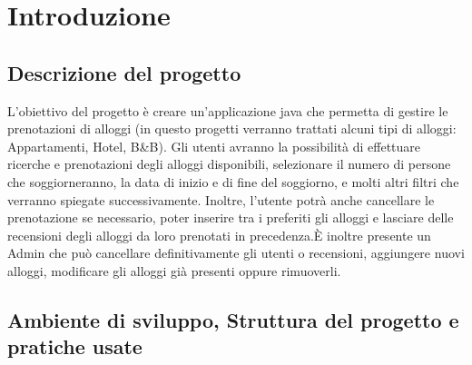 \documentclass[10pt]{article}
\begin{document}
\tableofcontents

\newpage

\section{Introduzione}

\subsection{Descrizione del progetto}

L'obiettivo del progetto è creare un'applicazione java che permetta di gestire le prenotazioni di alloggi (in questo progetti verranno trattati alcuni tipi di alloggi: Appartamenti, Hotel, B\&B). Gli utenti avranno la possibilità di effettuare ricerche e prenotazioni degli alloggi disponibili, selezionare il numero di persone che soggiorneranno, la data di inizio e di fine del soggiorno, e molti altri filtri che verranno spiegate successivamente. Inoltre, l'utente potrà anche cancellare le prenotazione se necessario, poter inserire tra i preferiti gli alloggi e lasciare delle recensioni degli alloggi da loro prenotati in precedenza.\`E inoltre presente un Admin che può cancellare definitivamente gli utenti o recensioni, aggiungere nuovi alloggi, modificare gli alloggi già presenti oppure rimuoverli.

\subsection{Ambiente di sviluppo, Struttura del progetto e pratiche usate}
\end{document}
